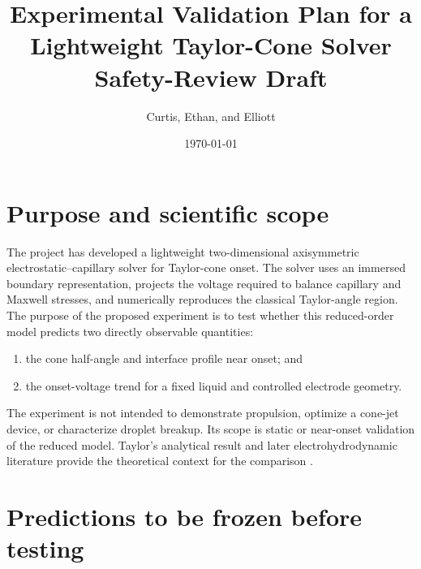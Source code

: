 \documentclass[11pt]{article}
\title{\textbf{Experimental Validation Plan for a Lightweight Taylor-Cone Solver}\\\large Safety-Review Draft}
\author{Curtis, Ethan, and Elliott}
\date{\today}
\begin{document}
\maketitle

\begin{center}
\end{center}

\section{Purpose and scientific scope}

The project has developed a lightweight two-dimensional axisymmetric electrostatic--capillary solver for Taylor-cone onset. The solver uses an immersed boundary representation, projects the voltage required to balance capillary and Maxwell stresses, and numerically reproduces the classical Taylor-angle region. The purpose of the proposed experiment is to test whether this reduced-order model predicts two directly observable quantities:
\begin{enumerate}
    \item the cone half-angle and interface profile near onset; and
    \item the onset-voltage trend for a fixed liquid and controlled electrode geometry.
\end{enumerate}

The experiment is not intended to demonstrate propulsion, optimize a cone-jet device, or characterize droplet breakup. Its scope is static or near-onset validation of the reduced model. Taylor's analytical result and later electrohydrodynamic literature provide the theoretical context for the comparison \cite{taylor1964disintegration,fernandez2007fluid,melcher1969electrohydrodynamics,saville1997electrohydrodynamics,hartman1999electrohydrodynamic}.

\section{Predictions to be frozen before testing}
\end{document}
